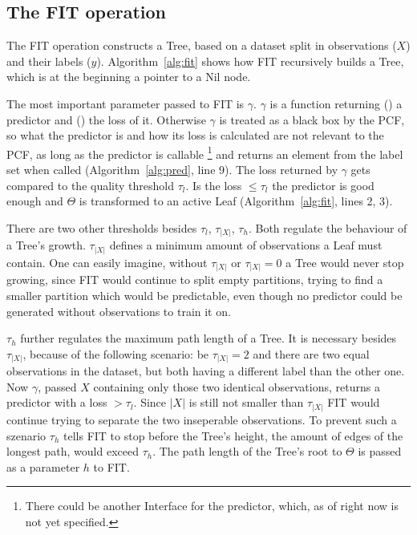 \subsection{The FIT operation}
\label{subsec:fit}

The FIT operation constructs a Tree, based on a dataset
split in observations ($X$) and their labels ($y$).
Algorithm~\ref{alg:fit} shows how FIT recursively builds a
Tree, which is at the beginning a pointer to a Nil node.

The most important parameter passed to FIT is $\gamma$.
$\gamma$ is a function returning () a
predictor and () the loss of it. Otherwise
$\gamma$ is treated as a black box by the PCF, so what the
predictor is and how its loss is calculated are not
relevant to the PCF, as long as the predictor is callable%
\footnote{There could be another Interface for the
  predictor, which, as of right now is not yet specified.}
and returns an element from the label set when called
(Algorithm~\ref{alg:pred}, line 9). The loss returned
by $\gamma$ gets compared to the quality threshold
$\tau_l$. Is the loss $\leq \tau_l$ the predictor is good
enough and $\Theta$ is transformed to an active Leaf
(Algorithm~\ref{alg:fit}, lines 2, 3).

There are two other thresholds besides $\tau_l$,
$\tau_{|X|}$, $\tau_h$. Both regulate the behaviour of a
Tree's growth. $\tau_{|X|}$ defines a minimum amount of
observations a Leaf must contain. One can easily imagine,
without $\tau_{|X|}$ or $\tau_{|X|} = 0$ a Tree would
never stop growing, since FIT would continue to split empty
partitions, trying to find a smaller partition which would
be predictable, even though no predictor could be
generated without observations to train it on.

$\tau_h$ further regulates the maximum path length of a
Tree. It is necessary besides $\tau_{|X|}$, because of the
following scenario: be $\tau_{|X|} = 2$ and there are two
equal observations in the dataset, but both having a
different label than the other one. Now $\gamma$, passed
$X$ containing only those two identical observations,
returns a predictor with a loss $> \tau_l$. Since $|X|$ is
still not smaller than $\tau_{|X|}$ FIT would continue
trying to separate the two inseperable observations. To
prevent such a szenario $\tau_h$ tells FIT to stop before
the Tree's height, the amount of edges of the longest path,
would exceed $\tau_h$. The path length of the Tree's root
to $\Theta$ is passed as a parameter $h$ to FIT.

